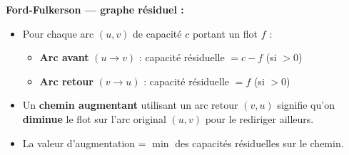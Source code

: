 \documentclass[12pt,a4paper]{article}
\begin{document}
\begin{methode}
\textbf{Ford-Fulkerson --- graphe r\'esiduel :}
\begin{itemize}[nosep]
    \item Pour chaque arc $(u,v)$ de capacit\'e $c$ portant un flot $f$ :
    \begin{itemize}[nosep]
        \item \textbf{Arc avant} $(u \to v)$ : capacit\'e r\'esiduelle $= c - f$ (si $> 0$)
        \item \textbf{Arc retour} $(v \to u)$ : capacit\'e r\'esiduelle $= f$ (si $> 0$)
    \end{itemize}
    \item Un \textbf{chemin augmentant} utilisant un arc retour $(v,u)$ signifie qu'on \textbf{diminue} le flot sur l'arc original $(u,v)$ pour le rediriger ailleurs.
    \item La valeur d'augmentation = $\min$ des capacit\'es r\'esiduelles sur le chemin.
\end{itemize}
\end{methode}
\end{document}
